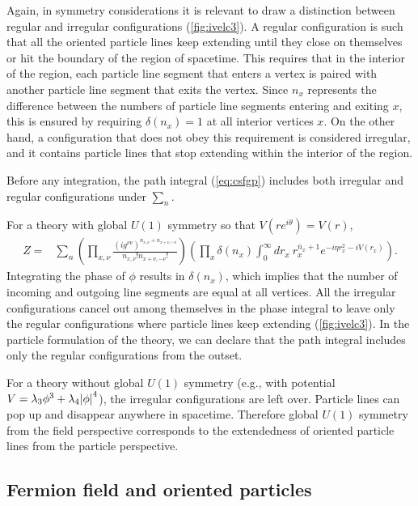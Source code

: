 \documentclass[12pt]{article}
\theoremstyle{definition}
\begin{document}
Again, in symmetry considerations it is relevant to draw a distinction between regular and irregular configurations (\cref{fig:ivelc3}). A regular configuration is such that all the oriented particle lines keep extending until they close on themselves or hit the boundary of the region of spacetime. This requires that in the interior of the region, each particle line segment that enters a vertex is paired with another particle line segment that exits the vertex. Since $n_x$ represents the difference between the numbers of particle line segments entering and exiting $x$, this is ensured by requiring $\delta(n_x)=1$ at all interior vertices $x$. On the other hand, a configuration that does not obey this requirement is considered irregular, and it contains particle lines that stop extending within the interior of the region.

Before any integration, the path integral (\ref{eq:csfgp}) includes both irregular and regular configurations under $\sum_n$. 

For a theory with global $U(1)$ symmetry so that $V(r e^{i\theta})=V(r)$,
\begin{align}
Z=&\sum_{n}(\prod_{x,\nu} \frac{(i g^{\nu\nu})^{n_{x,\nu}+n_{x+\nu,-\nu}}}{n_{x,\nu}! n_{x+\nu,-\nu}!}) (\prod_{x} \delta(n_x) \int_0^\infty dr_x ~ r_x^{\bar{n}_x+1} e^{-i\eta r_x^2-iV(r_x)}).
\label{eq:csfu1s}
\end{align}
Integrating the phase of $\phi$ results in $\delta(n_x)$, which implies that the number of incoming and outgoing line segments are equal at all vertices. All the irregular configurations cancel out among themselves in the phase integral to leave only the regular configurations where particle lines keep extending (\cref{fig:ivelc3}). In the particle formulation of the theory, we can declare that the path integral includes only the regular configurations from the outset.

For a theory without global $U(1)$  symmetry (e.g., with potential $V=\lambda_3 \phi^3+\lambda_4 \abs{\phi}^4$), the irregular configurations are left over. Particle lines can pop up and disappear anywhere in spacetime. Therefore global $U(1)$ symmetry from the field perspective corresponds to the extendedness of oriented particle lines from the particle perspective.

\subsection{Fermion field and oriented particles}
\end{document}

